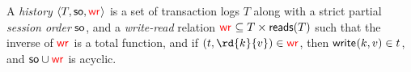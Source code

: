






\begin{definition}
 A \emph{history} ${\left\langle{T, \mathsf{so}, \textcolor{red}{\mathsf{wr}_{}}}\right\rangle}$ is a set of transaction logs $T$ along with a strict partial \emph{session order} $\mathsf{so}$, and a 
\emph{write-read} relation $\textcolor{red}{\mathsf{wr}_{}}\subseteq T\times \mathsf{reads}({T})$ such that
the inverse of $\textcolor{red}{\mathsf{wr}_{}}$ is a total function, and if $(\tr,\rd{\key}{\val})\in\wro$, then $\textsf{write}_{}({k},{{v}})\in{t}$, and $\mathsf{so}\cup\textcolor{red}{\mathsf{wr}_{}}$ is acyclic.
\end{definition}

